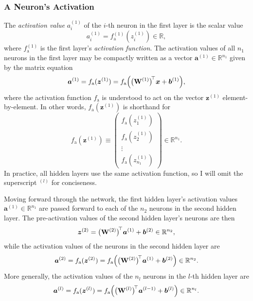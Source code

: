 \documentclass[11pt, a4paper]{article}
\renewcommand{\vec}[1]{\bm{#1}}
\newcommand{\mat}[1]{\mathbf{#1}}
\newcommand{\W}{\mat{W}}
\newcommand{\x}{\vec{x}}
\renewcommand{\b}{\vec{b}}
\newcommand{\z}{\vec{z}}
\renewcommand{\a}{\vec{a}}
\begin{document}
\subsubsection{A Neuron's Activation}
The \textit{activation value} $ a_{i}^{(1)} $ of the $ i $-th neuron in the first layer is the scalar value
\begin{equation*}
    a_{i}^{(1)} = f_{\text{a}}^{(1)}(z_{i}^{(1)}) \in \mathbb{R},
\end{equation*}
where $ f_{\text{a}}^{(1)} $ is the first layer's \textit{activation function}. The activation values of all $ n_{1} $ neurons in the first layer may be compactly written as a vector $ \a^{(1)} \in \mathbb{R}^{n_{1}} $ given by the matrix equation
\begin{equation*}
    \a^{(1)} = f_{\text{a}}(\z^{(1)}) = f_{\text{a}} \Big(\big( \W^{(1)} \big)^{\mspace{-4mu}\top}\x + \b^{(1)}\Big),
\end{equation*}
where the activation function $ f_{\text{a}} $ is understood to act on the vector $ \z^{(1)} $ element-by-element. In other words, $ f_{\text{a}} (\z^{(1)}) $ is shorthand for
\begin{equation*}
    f_{\text{a}} (\z^{(1)}) \equiv 
    \begin{pmatrix}
        f_{\text{a}}(z_{1}^{(1)})\\[1mm]
        f_{\text{a}}(z_{2}^{(1)})\\
        \vdots\\[0.5mm]
        f_{\text{a}}(z_{n_{1}}^{(1)})
    \end{pmatrix}
    \in \mathbb{R}^{n_{1}}.
\end{equation*}
In practice, all hidden layers use the same activation function, so I will omit the superscript $ {}^{(l)} $ for conciseness. 

Moving forward through the network, the first hidden layer's activation values $ \a^{(1)} \in \mathbb{R}^{n_{1}} $ are passed forward to each of the $ n_{2} $ neurons in the second hidden layer. The pre-activation values of the second hidden layer's neurons are then
\begin{equation*}
    \z^{(2)} = \big( \W^{(2)} \big)^{\mspace{-4mu}\top} \a^{(1)} + \b^{(2)} \in \mathbb{R}^{n_{2}},
\end{equation*}
while the activation values of the neurons in the second hidden layer are
\begin{equation*}
    \a^{(2)} = f_{\text{a}}(\z^{(2)}) = f_{\text{a}} \Big( \big( \W^{(2)} \big)^{\mspace{-4mu}\top} \a^{(1)} + \b^{(2)}\Big) \in \mathbb{R}^{n_{2}}.
\end{equation*}
More generally, the activation values of the $ n_{l} $ neurons in the $ l $-th hidden layer are
\begin{equation*}
    \a^{(l)} = f_{\text{a}}(\z^{(l)}) = f_{\text{a}} \Big( \big( \W^{(l)} \big)^{\mspace{-4mu}\top} \a^{(l-1)} + \b^{(l)}\Big) \in \mathbb{R}^{n_{l}}.
\end{equation*} 
\end{document}
